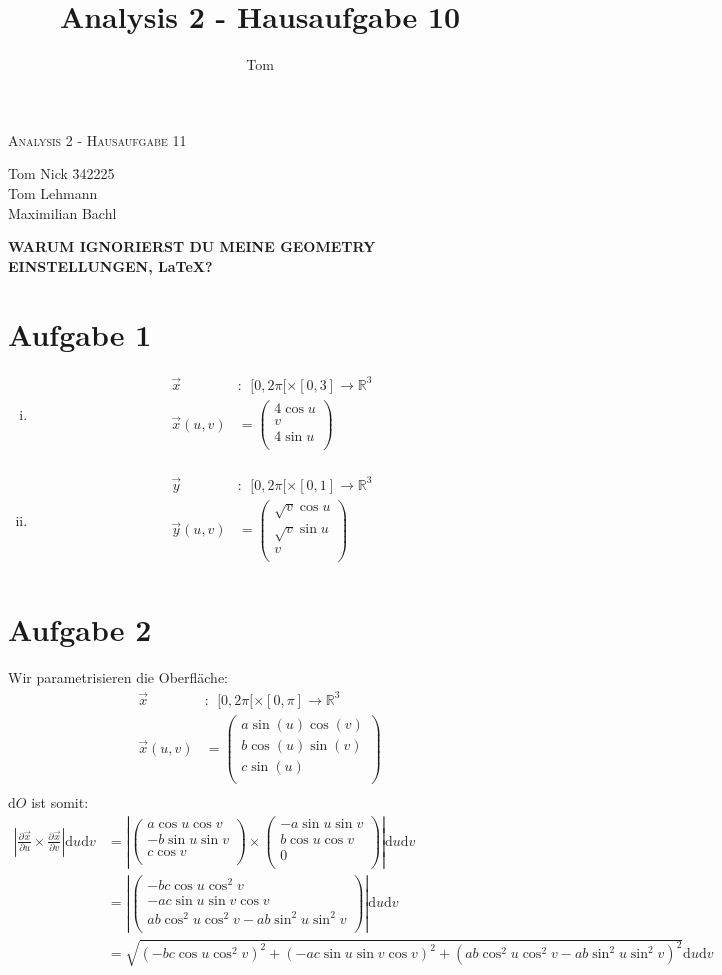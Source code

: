 \documentclass[10pt,a4paper,parskip=half]{scrartcl}
\author{Tom}
\title{Analysis 2 - Hausaufgabe 10}
\newcommand{\vecthree}[3]{\begin{pmatrix}#1\\#2\\#3\\\end {pmatrix}}
\begin{document}
\begin{center}
\textsc{\Large{Analysis 2 - Hausaufgabe 11}} \\
\end{center}
\begin{tabbing}
Tom Nick \hspace{1.4cm}\= 342225\\
Tom Lehmann\\
Maximilian Bachl
\end{tabbing}
\textbf{WARUM IGNORIERST DU MEINE GEOMETRY EINSTELLUNGEN, \LaTeX?}
\section*{Aufgabe 1}
\begin{enumerate}[(i)]
\item
\begin{align*}
\vec x&:~~ [0,2\pi[ \times [0,3] \to \mathbb{R}^3\\
\vec x(u,v) &= \vecthree{4\cos u}{v}{4\sin u} \\
\end{align*}
\item
\begin{align*}
\vec y&:~~ [0,2\pi[ \times [0,1] \to \mathbb{R}^3\\
\vec y(u,v) &= \vecthree{\sqrt v\cos u}{\sqrt v\sin u}{v} \\
\end{align*}
\end{enumerate}
\section*{Aufgabe 2}
Wir parametrisieren die Oberfläche:
\begin{align*}
\vec x&:~~ [0,2\pi[ \times [0,\pi] \to \mathbb{R}^3\\
\vec x(u,v) &= \vecthree{a\sin(u) \cos(v)}{b\cos(u)\sin(v)}{c \sin(u)} \\
\end{align*}
$\mathrm d O$ ist somit:
\begin{align*}
\left|\frac{\partial \vec x}{\partial u} \times \frac{\partial \vec x}{\partial v}\right| \mathrm d u \mathrm d v &= \left|\vecthree{a \cos u \cos v}{-b \sin u \sin v}{c \cos v} \times \vecthree{-a \sin u \sin v}{b \cos u \cos v}{0}\right| \mathrm d u \mathrm d v\\
&= \left|\vecthree{-bc \cos u \cos^2 v}{-ac \sin u \sin v \cos v}{ab \cos^2 u \cos^2 v - ab \sin^2 u \sin^2 v}\right| \mathrm d u \mathrm d v\\
&= \sqrt{\left(-bc \cos u \cos^2 v\right)^2 + \left(-ac \sin u \sin v \cos v\right)^2 + \left(ab \cos^2 u \cos^2 v - ab \sin^2 u \sin^2 v\right)^2} \mathrm d u \mathrm d v
\end{align*}
\end{document}

